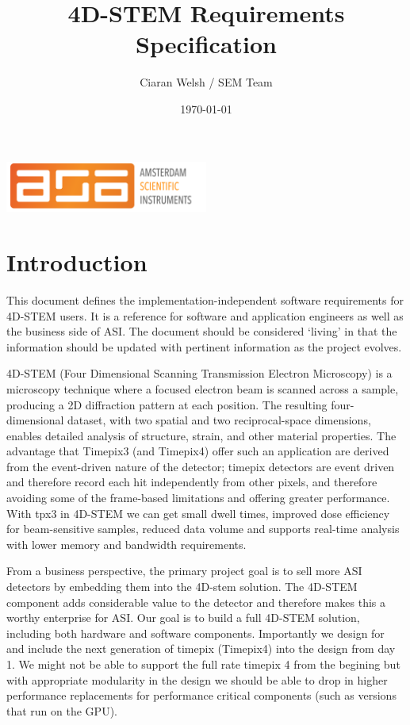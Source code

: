 \documentclass[10pt]{article}
\title{4D-STEM Requirements Specification}
\author{Ciaran Welsh / SEM Team}
\date{\today}
\begin{document}
\maketitle

\begin{center}
  \includegraphics[width=0.5\textwidth]{asi-logo}
\end{center}

\tableofcontents
\newpage


\section{Introduction}\label{sec:intro}
This document defines the implementation-independent software requirements for 4D-STEM users. It is a reference for software and application engineers as well as the business side of ASI. The document should be considered `living' in that the information should be updated with pertinent information as the project evolves.

4D-STEM (Four Dimensional Scanning Transmission Electron Microscopy) is a microscopy technique where a focused electron beam is scanned across a sample, producing a 2D diffraction pattern at each position. The resulting four-dimensional dataset, with two spatial and two reciprocal-space dimensions, enables detailed analysis of structure, strain, and other material properties. The advantage that Timepix3 (and Timepix4) offer such an application are derived from the event-driven nature of the detector; timepix detectors are event driven and therefore record each hit independently from other pixels, and therefore avoiding some of the frame-based limitations and offering greater performance. With tpx3 in 4D-STEM we can get small dwell times, improved dose efficiency for beam-sensitive samples, reduced data volume and supports real-time analysis with lower memory and bandwidth requirements.

From a business perspective, the primary project goal is to sell more ASI detectors by embedding them into the 4D-stem solution. The 4D-STEM component adds considerable value to the detector and therefore makes this a worthy enterprise for ASI. Our goal is to build a full 4D-STEM solution, including both hardware and software components. Importantly we design for and include the next generation of timepix (Timepix4) into the design from day 1. We might not be able to support the full rate timepix 4 from the begining but with appropriate modularity in the design we should be able to drop in higher performance replacements for performance critical components (such as versions that run on the GPU).
\end{document}
